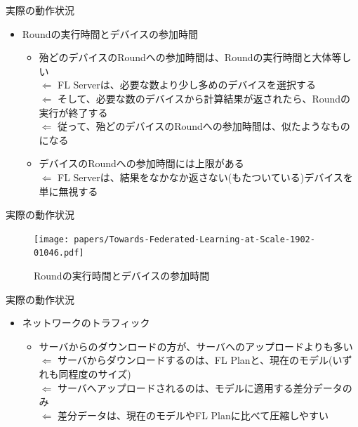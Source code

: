 \documentclass[dvipdfmx,notheorems,t]{beamer}
\begin{document}
\begin{frame}{実際の動作状況}

\begin{itemize}
	\item Roundの実行時間とデバイスの参加時間
	\begin{itemize}
		\item 殆どのデバイスのRoundへの参加時間は、Roundの実行時間と大体等しい \\
		$\Leftarrow$ FL Serverは、必要な数より少し多めのデバイスを選択する \\
		$\Leftarrow$ そして、必要な数のデバイスから計算結果が返されたら、Roundの実行が終了する \\
		$\Leftarrow$ 従って、殆どのデバイスのRoundへの参加時間は、似たようなものになる
		\newline
		
		\item デバイスのRoundへの参加時間には上限がある \\
		$\Leftarrow$ FL Serverは、結果をなかなか返さない(もたついている)デバイスを単に無視する
	\end{itemize}
\end{itemize}

\end{frame}

\begin{frame}{実際の動作状況}

\begin{figure}
	\centering
	\texttt{[image: papers/Towards-Federated-Learning-at-Scale-1902-01046.pdf]}
	\caption{Roundの実行時間とデバイスの参加時間~\cite{DBLP:journals/corr/abs-1902-01046}}
	\label{fig:round-execution-time}
\end{figure}

\end{frame}

\begin{frame}{実際の動作状況}

\begin{itemize}
	\item ネットワークのトラフィック
	\begin{itemize}
		\item サーバからのダウンロードの方が、サーバへのアップロードよりも多い \\
		$\Leftarrow$ サーバからダウンロードするのは、FL Planと、現在のモデル(いずれも同程度のサイズ) \\
		$\Leftarrow$ サーバへアップロードされるのは、モデルに適用する差分データのみ \\
		$\Leftarrow$ 差分データは、現在のモデルやFL Planに比べて圧縮しやすい
	\end{itemize}
\end{itemize}

\end{frame}
\end{document}
